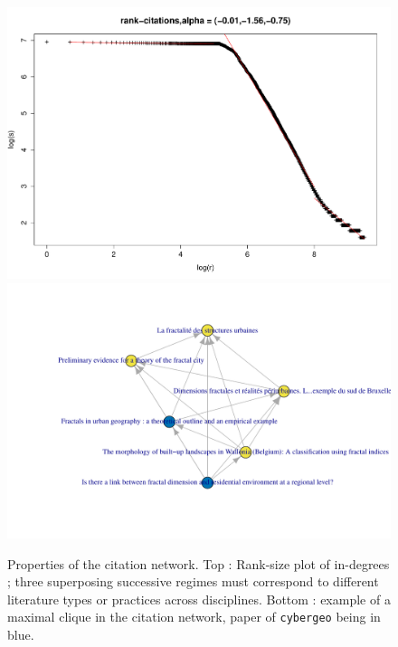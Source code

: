 \begin{figure}
\includegraphics[width=\textwidth]{Figures/PartI/QuantitativeEpistemo/HyperNetwork/rank-size-all}
\includegraphics[width=\textwidth]{Figures/PartI/QuantitativeEpistemo/HyperNetwork/cybclic_2cyb_13761}
\caption[Properties of the citation network]{Properties of the citation network. Top : Rank-size plot of in-degrees ; three superposing successive regimes must correspond to different literature types or practices across disciplines. Bottom : example of a maximal clique in the citation network, paper of \texttt{cybergeo} being in blue.}
\label{fig:quantepistemo:citnw}
\end{figure}


